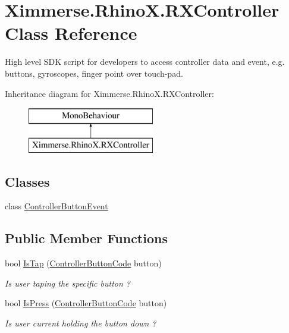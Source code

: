 \hypertarget{class_ximmerse_1_1_rhino_x_1_1_r_x_controller}{}\section{Ximmerse.\+Rhino\+X.\+R\+X\+Controller Class Reference}
\label{class_ximmerse_1_1_rhino_x_1_1_r_x_controller}


High level S\+DK script for developers to access controller data and event, e.\+g. buttons, gyroscopes, finger point over touch-\/pad.  


Inheritance diagram for Ximmerse.\+Rhino\+X.\+R\+X\+Controller\+:\begin{figure}[H]
\begin{center}
\leavevmode
\includegraphics[height=2.000000cm]{class_ximmerse_1_1_rhino_x_1_1_r_x_controller}
\end{center}
\end{figure}
\subsection*{Classes}
\begin{DoxyCompactItemize}
\item 
class \mbox{\hyperlink{class_ximmerse_1_1_rhino_x_1_1_r_x_controller_1_1_controller_button_event}{Controller\+Button\+Event}}
\end{DoxyCompactItemize}
\subsection*{Public Member Functions}
\begin{DoxyCompactItemize}
\item 
bool \mbox{\hyperlink{class_ximmerse_1_1_rhino_x_1_1_r_x_controller_a89fb2bd2521d43205645fb6b205ddbcf}{Is\+Tap}} (\mbox{\hyperlink{namespace_ximmerse_1_1_rhino_x_a99f73f11bba9d4b424daba6c5a5abc0b}{Controller\+Button\+Code}} button)
\begin{DoxyCompactList}\small\item\em Is user taping the specific button ? \end{DoxyCompactList}\item 
bool \mbox{\hyperlink{class_ximmerse_1_1_rhino_x_1_1_r_x_controller_aa9d23fdcda8d7e24e342c26e5b8d6b27}{Is\+Press}} (\mbox{\hyperlink{namespace_ximmerse_1_1_rhino_x_a99f73f11bba9d4b424daba6c5a5abc0b}{Controller\+Button\+Code}} button)
\begin{DoxyCompactList}\small\item\em Is user current holding the button down ? \end{DoxyCompactList}\end{DoxyCompactItemize}
